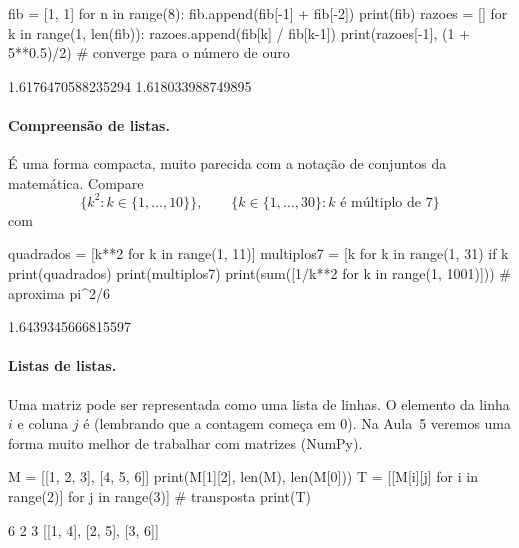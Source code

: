 \begin{entrada}
fib = [1, 1]
for n in range(8):
    fib.append(fib[-1] + fib[-2])
print(fib)
razoes = []
for k in range(1, len(fib)):
    razoes.append(fib[k] / fib[k-1])
print(razoes[-1], (1 + 5**0.5)/2)    # converge para o número de ouro
\end{entrada}
\begin{saida}
[1, 1, 2, 3, 5, 8, 13, 21, 34, 55]
1.6176470588235294 1.618033988749895
\end{saida}

\paragraph{Compreensão de listas.} É uma forma compacta, muito parecida com a notação de conjuntos da matemática.
Compare
\[
\{k^2 : k\in\{1,\dots,10\}\},\qquad \{k\in\{1,\dots,30\} : k \text{ é múltiplo de } 7\}
\]
com

\begin{entrada}
quadrados = [k**2 for k in range(1, 11)]
multiplos7 = [k for k in range(1, 31) if k %
print(quadrados)
print(multiplos7)
print(sum([1/k**2 for k in range(1, 1001)]))    # aproxima pi^2/6
\end{entrada}
\begin{saida}
[1, 4, 9, 16, 25, 36, 49, 64, 81, 100]
[7, 14, 21, 28]
1.6439345666815597
\end{saida}

\begin{sintaxe}
\end{sintaxe}

\paragraph{Listas de listas.} Uma matriz pode ser representada como uma lista de linhas. O elemento da linha $i$ e
coluna $j$ é  (lembrando que a contagem começa em 0). Na Aula~5 veremos uma forma muito melhor de
trabalhar com matrizes (NumPy).

\begin{entrada}
M = [[1, 2, 3],
     [4, 5, 6]]
print(M[1][2], len(M), len(M[0]))
T = [[M[i][j] for i in range(2)] for j in range(3)]   # transposta
print(T)
\end{entrada}
\begin{saida}
6 2 3
[[1, 4], [2, 5], [3, 6]]
\end{saida}

